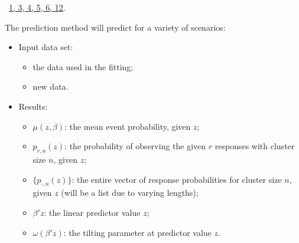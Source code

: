 \documentclass[reqno]{amsart}
\renewcommand{\NWlink}[2]{\hyperlink{#1}{#2}}
\begin{document}
\begin{flushleft}
\begin{list}{}{}
\mbox{}\verb@  if (beta) idx <- c(idx, 1:p)@\\
\mbox{}\verb@  if (f0) idx <- c(idx, (p+1):m)@\\
\mbox{}\verb@  @\\
\mbox{}\verb@  vc <- object$vcov[idx,idx]@\\
\mbox{}\verb@  vc@\\
\mbox{}\verb@}@\\
\mbox{}\verb@@\\
\mbox{}\verb@#' @{\tt @}\verb@rdname coef.spglm@\\
\mbox{}\verb@#'@\\
\mbox{}\verb@#' @{\tt @}\verb@importFrom stats logLik@\\
\mbox{}\verb@#' @{\tt @}\verb@export@\\
\mbox{}\verb@logLik.spglm <- function(object, ...){@\\
\mbox{}\verb@  object$loglik@\\
\mbox{}\verb@}@\\
\mbox{}\verb@                              @\\
\mbox{}\verb@@{\NWsep}
\end{list}
\vspace{-1.5ex}
\footnotesize
\begin{list}{}{\setlength{\itemsep}{-\parsep}\setlength{\itemindent}{-\leftmargin}}
\item \NWtxtFileDefBy\ \NWlink{nuweb1}{1}\NWlink{nuweb3}{, 3}\NWlink{nuweb4}{, 4}\NWlink{nuweb5}{, 5}\NWlink{nuweb6}{, 6}\NWlink{nuweb12}{, 12}.

\item{}
\end{list}
\vspace{4ex}
\end{flushleft}
The prediction method will predict for a variety of scenarios:
\begin{itemize}
\item Input data set:
  \begin{itemize}
    \item the data used in the fitting;
    \item new data.
  \end{itemize}
\item Results:
  \begin{itemize}
    \item $\mu(z,\beta)$: the mean event probability, given $z$;
    \item $p_{r,n}(z)$: the probability of observing the given $r$ responses with cluster size $n$, given $z$;
    \item $\{p_{\cdot,n}(z)\}$: the entire vector of response probabilities for cluster size $n$, given $z$ (will be a list due to varying lengths);
    \item $\beta'z$: the linear predictor value $z$;
    \item $\omega(\beta'z)$: the tilting parameter at predictor value $z$.
  \end{itemize}
\end{itemize}
\end{document}
